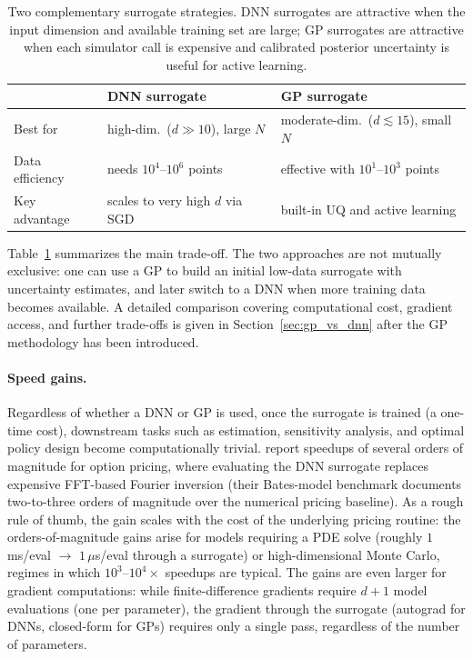 \documentclass[11pt,a4paper]{report}
\begin{document}
\begin{table}[ht]
\centering
\small
\begin{tabular}{@{}p{3.5cm}p{5.0cm}p{5.0cm}@{}}
\toprule
& \textbf{DNN surrogate} & \textbf{GP surrogate} \\
\midrule
Best for & high-dim.\ ($d \gg 10$), large $N$ & moderate-dim.\ ($d \lesssim 15$), small $N$ \\
Data efficiency & needs $10^4$--$10^6$ points & effective with $10^1$--$10^3$ points \\
Key advantage & scales to very high $d$ via SGD & built-in UQ and active learning \\
\bottomrule
\end{tabular}
\caption{Two complementary surrogate strategies. DNN surrogates are attractive when the input dimension and available training set are large; GP surrogates are attractive when each simulator call is expensive and calibrated posterior uncertainty is useful for active learning.}
\label{tab:surrogate_strategy_comparison}
\end{table}

Table~\ref{tab:surrogate_strategy_comparison} summarizes the main trade-off.  The two approaches are not mutually exclusive: one can use a GP to build an initial low-data surrogate with uncertainty estimates, and later switch to a DNN when more training data becomes available.  A detailed comparison covering computational cost, gradient access, and further trade-offs is given in Section~\ref{sec:gp_vs_dnn} after the GP methodology has been introduced.

\paragraph{Speed gains.}  Regardless of whether a DNN or GP is used, once the surrogate is trained (a one-time cost), downstream tasks such as estimation, sensitivity analysis, and optimal policy design become computationally trivial.  \citet{chen2025Deep} report speedups of several orders of magnitude for option pricing, where evaluating the DNN surrogate replaces expensive FFT-based Fourier inversion (their Bates-model benchmark documents two-to-three orders of magnitude over the numerical pricing baseline).  As a rough rule of thumb, the gain scales with the cost of the underlying pricing routine: the orders-of-magnitude gains arise for models requiring a PDE solve (roughly $1$\,ms/eval $\to$ $1$\,$\mu$s/eval through a surrogate) or high-dimensional Monte Carlo, regimes in which $10^3$--$10^4\times$ speedups are typical.  The gains are even larger for gradient computations: while finite-difference gradients require $d+1$ model evaluations (one per parameter), the gradient through the surrogate (autograd for DNNs, closed-form for GPs) requires only a single pass, regardless of the number of parameters.
\end{document}
